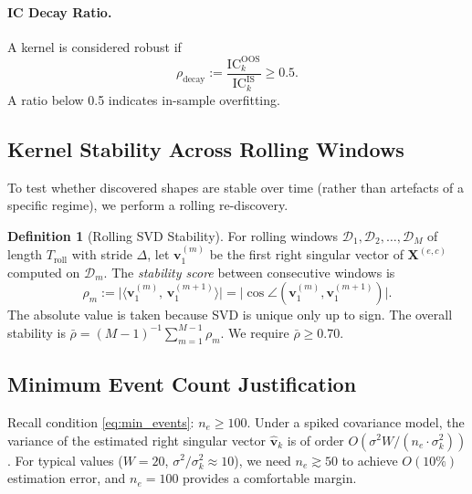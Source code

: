 \documentclass[11pt,a4paper]{article}
\theoremstyle{definition}
\newtheorem{definition}{Definition}[section]
\theoremstyle{plain}
\newcommand{\Xmat}{\mathbf{X}}
\newcommand{\bvec}[1]{\mathbf{#1}}
\newcommand{\inner}[2]{\langle #1,\, #2 \rangle}
\begin{document}
\paragraph{IC Decay Ratio.}
A kernel is considered robust if
\begin{equation}
    \rho_{\mathrm{decay}} :=
    \frac{\mathrm{IC}^{\mathrm{OOS}}_k}{\mathrm{IC}^{\mathrm{IS}}_k} \geq 0.5.
    \label{eq:ic_decay}
\end{equation}
A ratio below 0.5 indicates in-sample overfitting.

\subsection{Kernel Stability Across Rolling Windows}

To test whether discovered shapes are stable over time (rather than artefacts of a
specific regime), we perform a rolling re-discovery.

\begin{definition}[Rolling SVD Stability]
\label{def:rolling_stability}
For rolling windows $\mathcal{D}_1, \mathcal{D}_2, \ldots, \mathcal{D}_M$ of length
$T_{\mathrm{roll}}$ with stride $\Delta$, let $\bvec{v}^{(m)}_1$ be the first right
singular vector of $\Xmat^{(e,c)}$ computed on $\mathcal{D}_m$. The \emph{stability
score} between consecutive windows is
\begin{equation}
    \rho_m :=
    \bigl|\inner{\bvec{v}^{(m)}_1}{\bvec{v}^{(m+1)}_1}\bigr|
    = \bigl|\cos\angle(\bvec{v}^{(m)}_1, \bvec{v}^{(m+1)}_1)\bigr|.
    \label{eq:rolling_stability}
\end{equation}
The absolute value is taken because SVD is unique only up to sign. The overall stability
is $\bar{\rho} = (M-1)^{-1}\sum_{m=1}^{M-1} \rho_m$. We require $\bar{\rho} \geq 0.70$.
\end{definition}

\subsection{Minimum Event Count Justification}

Recall condition \eqref{eq:min_events}: $n_e \geq 100$. Under a spiked covariance model,
the variance of the estimated right singular vector $\hat{\bvec{v}}_k$ is of order
$O(\sigma^2 W / (n_e \cdot \sigma_k^2))$. For typical values ($W = 20$,
$\sigma^2 / \sigma_k^2 \approx 10$), we need $n_e \gtrsim 50$ to achieve $O(10\%)$
estimation error, and $n_e = 100$ provides a comfortable margin.
\end{document}
